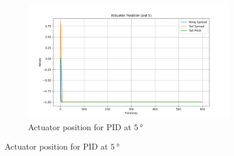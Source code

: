 \begin{figure}[h]
\begin{subfigure}[b]{0.6\textwidth}
        \centering
        \includegraphics[width=\textwidth]{./img/ActuatorPID5.png}
        \caption{Actuator position for PID at $\SI{5}{\degree}$}
    \end{subfigure}
\end{figure}
\vfill{}
